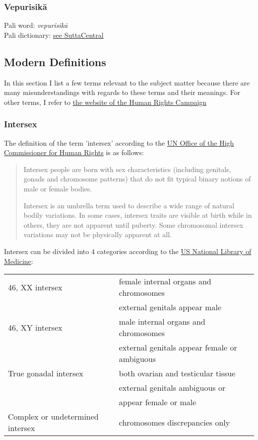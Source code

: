 \subsubsection{Vepurisikā}
Pali word: {\em vepurisikā} \\
Pali dictionary: \href{https://suttacentral.net/define/vepurisik%C4%81}{see SuttaCentral} \\

\subsection{Modern Definitions}
In this section I list a few terms relevant to the subject matter because there are many misunderstandings with regards to these terms and their meanings. For other terms, I refer to \href{https://www.hrc.org/resources/glossary-of-terms}{the website of the Human Rights Campaign}

\subsubsection{Intersex}
\label{intersex}
The definition of the term 'intersex' according to the \href{https://unfe.org/system/unfe-65-Intersex_Factsheet_ENGLISH.pdf}{UN Office of the High Commissioner for Human Rights} is as follows:

\begin{quote}
Intersex people are born with sex characteristics (including genitals, gonads and chromosome patterns) that do not fit typical binary notions of male or female bodies.

Intersex is an umbrella term used to describe a wide range of natural bodily variations. In some cases, intersex traits are visible at birth while in others, they are not apparent until puberty. Some chromosomal intersex variations may not be physically apparent at all.
\end{quote}

Intersex can be divided into 4 categories according to the \href{https://medlineplus.gov/ency/article/001669.htm}{US National Library of Medicine}:

\begin{tabular}{ l l }
46, XX intersex & female internal organs and chromosomes \\
& external genitals appear male \\
46, XY intersex & male internal organs and chromosomes \\
& external genitals appear female or ambiguous \\
True gonadal intersex & both ovarian and testicular tissue \\
& external genitals ambiguous or \\
& appear female or male \\
Complex or undetermined intersex & chromosomes discrepancies only \\
\end{tabular}


